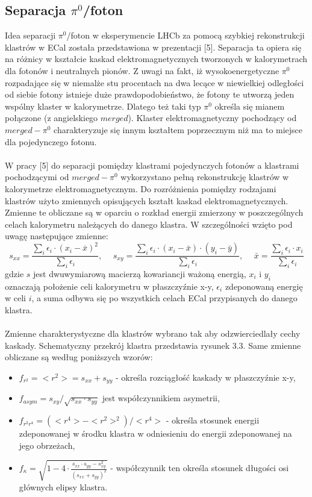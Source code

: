 \documentclass{pracamgr}
\begin{document}
\subsection{Separacja $\pi^0$/foton}

Idea separacji $\pi^0$/foton w eksperymencie LHCb za pomocą szybkiej rekonstrukcji klastrów w ECal została przedstawiona w prezentacji [5]. Separacja ta opiera się na różnicy w kształcie kaskad elektromagnetycznych tworzonych w kalorymetrach dla fotonów i neutralnych pionów. Z uwagi na fakt, iż wysokoenergetyczne $\pi^0$ rozpadające się w niemalże stu procentach na dwa lecące w niewielkiej odległości od siebie fotony istnieje duże prawdopodobieństwo, że fotony te utworzą jeden wspólny klaster w kalorymetrze. Dlatego też taki typ $\pi^0$ określa się mianem połączone (z angielskiego $merged$). Klaster elektromagnetyczny pochodzący od $merged-\pi^0$  charakteryzuje się innym kształtem poprzecznym niż ma to miejsce dla pojedynczego fotonu.
\\\\
\noindent
W pracy [5] do separacji pomiędzy klastrami pojedynczych fotonów a klastrami pochodzącymi od $merged-\pi^0$ wykorzystano pełną rekonstrukcję klastrów w kalorymetrze elektromagnetycznym. Do rozróżnienia pomiędzy rodzajami klastrów użyto zmiennych opisujących kształt kaskad elektromagnetycznych. Zmienne te obliczane są w oparciu o rozkład energii zmierzony w poszczególnych celach kalorymetru należących do danego klastra. W szczególności wzięto pod uwagę następujące zmienne:
\[
 s_{xx}=\frac{\sum_i \epsilon_i \cdot (x_i - \bar{x})^2}{\sum_i \epsilon_i},
 \hspace{15pt}
 s_{xy}=\frac{\sum_i \epsilon_i \cdot (x_i - \bar{x})\cdot (y_i - \bar{y})}{\sum_i \epsilon_i},
 \hspace{15pt}
 \bar{x}=\frac{\sum_i \epsilon_i \cdot x_i}{\sum_i \epsilon_i}
\]
gdzie $s$ jest dwuwymiarową macierzą kowariancji ważoną energią, $x_i$ i $y_i$ oznaczają położenie celi kalorymetru w płaszczyźnie x-y, $\epsilon_i$ zdeponowaną energię w celi $i$, a suma odbywa się po wszystkich celach ECal przypisanych do danego klastra. 
\\\\
\noindent
Zmienne charakterystyczne dla klastrów wybrano tak aby odzwierciedlały cechy kaskady. Schematyczny przekrój klastra przedstawia rysunek 3.3. Same zmienne obliczane są według poniższych wzorów:

\begin{itemize}
 \item $f_{r^2}=<r^2>=s_{xx}+s_{yy}$ \normalsize{ - określa rozciągłość kaskady w płaszczyźnie x-y}, 
 \item $f_{asym}=s_{xy}/\sqrt{s_{xx}\cdot s_{yy}}$ \normalsize{ jest współczynnikiem asymetrii},
 \item $f_{r^2r^4}=(<r^4> - <r^2>^2)/<r^4>$ \normalsize{ - określa stosunek energii zdeponowanej w środku klastra w odniesieniu do energii zdeponowanej na jego obrzeżach},
 \item $f_{\kappa}=\sqrt{1-4\cdot \frac{s_{xx}\cdot s_{yy} - s_{xy}^{2}}{(s_{xx} + s_{yy})^2}}$ 
\normalsize{ - współczynnik ten określa stosunek długości osi głównych elipsy klastra}. 
\end{itemize}
\end{document}

